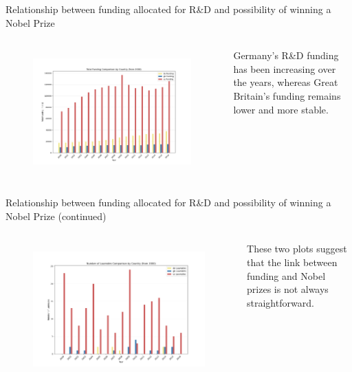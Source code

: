 \documentclass[aspectratio=169,xcolor=dvipsnames]{beamer}
\begin{document}
\begin{frame}{Relationship between funding allocated for R\&D and possibility of winning a Nobel Prize}
	\begin{columns}[c]
		\begin{figure}[H]
			\centering
			\includegraphics[width=\textwidth]{../queries/plots/funding_comparison_by_country.png}
			\label{fig:fundings_per_country}
		\end{figure}
		Germany's R\&D funding has been increasing over the years, whereas
		Great Britain's funding remains lower and more stable.
	\end{columns}
\end{frame}

\begin{frame}{Relationship between funding allocated for R\&D and possibility of winning a Nobel Prize (continued)}
	\begin{columns}[c]
		\begin{figure}[H]
			\centering
			\includegraphics[width=\textwidth]{../queries/plots/laureates_comparison_by_country.png}
			\label{fig:laureates_per_country}
		\end{figure}
		These two plots suggest that the link between funding and Nobel prizes is not always
		straightforward.
	\end{columns}
\end{frame}
\end{document}
